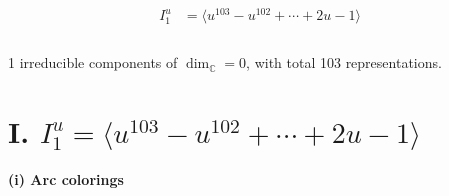 \documentclass[1p]{elsarticle_modified}
\theoremstyle{definition}
\begin{document}
\begin{align*}
I^u_{1}&=\langle 
u^{103}- u^{102}+\cdots+2 u-1\rangle \\
\\
\end{align*}
\raggedright * 1 irreducible components of $\dim_{\mathbb{C}}=0$, with total 103 representations.\\
\newpage
\renewcommand{\arraystretch}{1}
\centering \section*{I. $I^u_{1}= \langle u^{103}- u^{102}+\cdots+2 u-1 \rangle$}
\flushleft \textbf{(i) Arc colorings}\\
\end{document}
